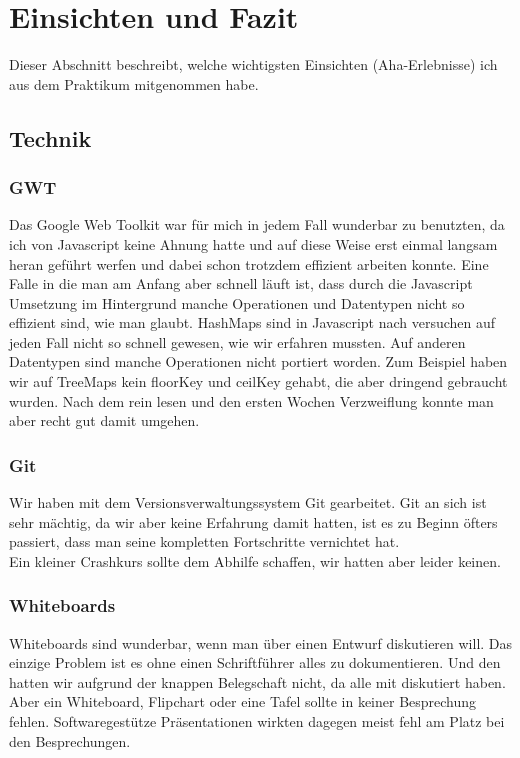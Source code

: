 \section{Einsichten und Fazit}
Dieser Abschnitt beschreibt, welche wichtigsten Einsichten (Aha-Erlebnisse) ich aus dem
Praktikum mitgenommen habe.

\subsection{Technik}

\subsubsection{GWT}

Das Google Web Toolkit war für mich in jedem Fall wunderbar zu benutzten, da ich von Javascript keine Ahnung hatte und auf diese Weise erst einmal langsam heran geführt werfen und dabei schon trotzdem effizient arbeiten konnte. Eine Falle in die man am Anfang aber schnell läuft ist, dass durch die Javascript Umsetzung im Hintergrund manche Operationen und Datentypen nicht so effizient sind, wie man glaubt. HashMaps sind in Javascript nach versuchen auf jeden Fall nicht so schnell gewesen, wie wir erfahren mussten. Auf anderen Datentypen sind manche Operationen nicht portiert worden. Zum Beispiel haben wir auf TreeMaps kein floorKey und ceilKey gehabt, die aber dringend gebraucht wurden. Nach dem rein lesen und den ersten Wochen Verzweiflung konnte man aber recht gut damit umgehen.

\subsubsection{Git}

Wir haben mit dem Versionsverwaltungssystem Git gearbeitet. Git an sich ist sehr mächtig, da wir aber keine Erfahrung damit hatten, ist es zu Beginn öfters passiert, dass man seine kompletten Fortschritte vernichtet hat.\\
Ein kleiner Crashkurs sollte dem Abhilfe schaffen, wir hatten aber leider keinen.

\subsubsection{Whiteboards}

Whiteboards sind wunderbar, wenn man über einen Entwurf diskutieren will. Das einzige Problem ist es ohne einen Schriftführer alles zu dokumentieren. Und den hatten wir aufgrund der knappen Belegschaft nicht, da alle mit diskutiert haben. Aber ein Whiteboard, Flipchart oder eine Tafel sollte in keiner Besprechung fehlen. Softwaregestütze Präsentationen wirkten dagegen meist fehl am Platz bei den Besprechungen.

